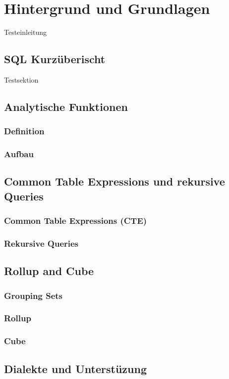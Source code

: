 \chapter{Hintergrund und Grundlagen}
Testeinleitung

\section{SQL Kurzüberischt}
Testsektion \cite{adobe}

\section{Analytische Funktionen}

\subsection{Definition}

\subsection{Aufbau}




\section{Common Table Expressions und rekursive Queries}

\subsection{Common Table Expressions (CTE)}

\subsection{Rekursive Queries}




\section{Rollup and Cube}

\subsection{Grouping Sets}

\subsection{Rollup}

\subsection{Cube}



\section{Dialekte und Unterstüzung}